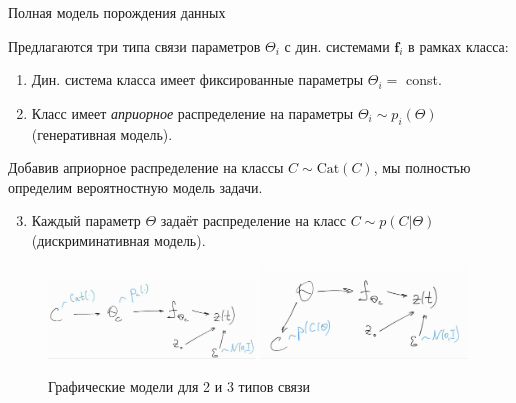 \documentclass[10pt]{beamer}
\theoremstyle{definition}
\begin{document}
	\begin{frame}{Полная модель порождения данных}
		
		Предлагаются три типа связи параметров $\Theta_i$ с дин. системами $\textbf{f}_i$ в рамках класса:
		
		\begin{enumerate}
			\item Дин. система класса имеет фиксированные параметры $\Theta_i = $ const. 
			
			\item Класс имеет \emph{априорное} распределение на параметры $\Theta_i \sim p_i(\Theta)$ (генеративная модель).
		\end{enumerate}
		
		Добавив априорное распределение на классы $ C \sim \text{Cat}(C) $, мы полностью определим вероятностную модель задачи.
		
		\begin{enumerate}
			\setcounter{enumi}{2}
			\item Каждый параметр $\Theta$ задаёт распределение на класс $C \sim p(C | \Theta)$ (дискриминативная модель).
		\end{enumerate}
		
		\begin{figure}
			\centering
			\includegraphics[width=0.49\textwidth,keepaspectratio]{img/bayes_graph_gen.jpg}
			\includegraphics[width=0.49\textwidth,keepaspectratio]{img/bayes_graph_discr.png}
			\caption{Графические модели для 2 и 3 типов связи}
		\end{figure}
		
	\end{frame}
\end{document}
